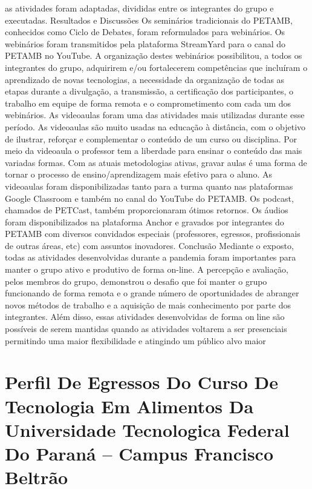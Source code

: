 as atividades foram adaptadas, divididas entre os integrantes do grupo e executadas. 
Resultados e Discussões 
Os seminários tradicionais do PETAMB, conhecidos como Ciclo de Debates, foram reformulados 
para webinários. Os webinários foram transmitidos pela plataforma StreamYard para o canal do 
PETAMB no YouTube. A organização destes webinários possibilitou, a todos os integrantes do 
grupo, adquirirem e/ou fortalecerem competências que incluíram o aprendizado de novas 
tecnologias, a necessidade da organização de todas as etapas durante a divulgação, a transmissão, 
a certificação dos participantes, o trabalho em equipe de forma remota e o comprometimento com 
cada um dos webinários. As videoaulas foram uma das atividades mais utilizadas durante esse
período. As videoaulas são muito usadas na educação à distância, com o objetivo de ilustrar, 
reforçar e complementar o conteúdo de um curso ou disciplina. Por meio da videoaula o professor 
tem a liberdade para ensinar o conteúdo das mais variadas formas. Com as atuais metodologias 
ativas, gravar aulas é uma forma de tornar o processo de ensino/aprendizagem mais efetivo para o 
aluno. As videoaulas foram disponibilizadas tanto para a turma quanto nas plataformas Google 
Classroom e também no canal do YouTube do PETAMB. Os podcast, chamados de PETCast, 
também proporcionaram ótimos retornos. Os áudios foram disponibilizados na plataforma Anchor 
e gravados por integrantes do PETAMB com diversos convidados especiais (professores, egressos, 
profissionais de outras áreas, etc) com assuntos inovadores. 
Conclusão 
Mediante o exposto, todas as atividades desenvolvidas durante a pandemia foram importantes para 
manter o grupo ativo e produtivo de forma on-line. A percepção e avaliação, pelos membros do 
grupo, demonstrou o desafio que foi manter o grupo funcionando de forma remota e o grande 
número de oportunidades de abranger novos métodos de trabalho e a aquisição de mais 
conhecimento por parte dos integrantes. Além disso, essas atividades desenvolvidas de forma online são possíveis de serem mantidas quando as atividades voltarem a ser presenciais permitindo 
uma maior flexibilidade e atingindo um público alvo maior




\section*{Perfil De Egressos Do Curso De Tecnologia Em Alimentos Da Universidade Tecnologica Federal Do Paraná – Campus Francisco Beltrão}

